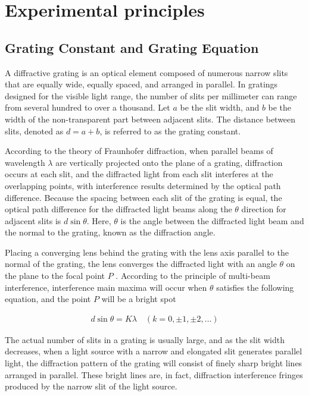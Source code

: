 \documentclass[UTF8]{article}
\begin{document}
    
        
	\section{Experimental principles}   
    \subsection{Grating Constant and Grating Equation}
    A diffractive grating is an optical element composed of numerous narrow slits that are equally wide, equally spaced, and arranged in parallel. In gratings designed for the visible light range, the number of slits per millimeter can range from several hundred to over a thousand. Let $a$ be the slit width, and $b$ be the width of the non-transparent part between adjacent slits. The distance between slits, denoted as $d = a + b$, is referred to as the grating constant.
    
   According to the theory of Fraunhofer diffraction, when parallel beams of wavelength $\lambda$ are vertically projected onto the plane of a grating, diffraction occurs at each slit, and the diffracted light from each slit interferes at the overlapping points, with interference results determined by the optical path difference. Because the spacing between each slit of the grating is equal, the optical path difference for the diffracted light beams along the $\theta$ direction for adjacent slits is $d\sin \theta$. Here, $\theta$ is the angle between the diffracted light beam and the normal to the grating, known as the diffraction angle.
   
   Placing a converging lens behind the grating with the lens axis parallel to the normal of the grating, the lens converges the diffracted light with an angle  $\theta$ on the plane to the focal point $P$ . According to the principle of multi-beam interference, interference main maxima will occur when $\theta$ satisfies the following equation, and the point $P$ will be a bright spot
   
   \begin{eqnarray}
   d\sin \theta = K\lambda \quad (k = 0,\pm 1, \pm 2 , \dots)
   \end{eqnarray}
   
   The actual number of slits in a grating is usually large, and as the slit width decreases, when a light source with a narrow and elongated slit generates parallel light, the diffraction pattern of the grating will consist of finely sharp bright lines arranged in parallel. These bright lines are, in fact, diffraction interference fringes produced by the narrow slit of the light source.
   
\end{document}
